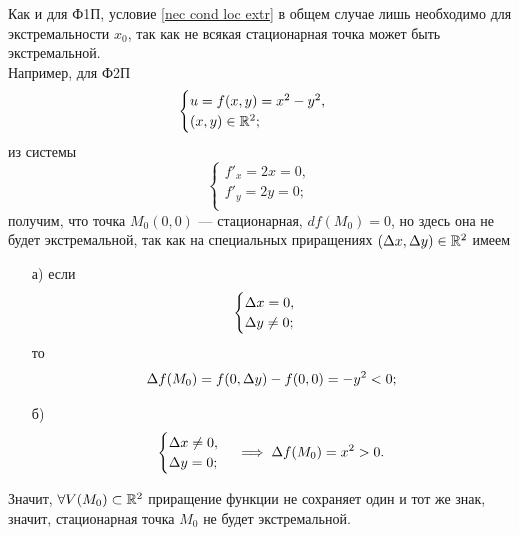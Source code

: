 \documentclass[../../main.tex]{subfiles}
\begin{document}
	\begin{rem}
		Как и для Ф1П, условие \eqref{nec cond loc extr} в общем случае
		лишь необходимо для экстремальности $x_0$, так как не всякая
		стационарная точка может быть экстремальной. \\
		Например, для Ф2П
		\[
		\begin{cases}
			u = f (x, y) = x^2 - y^2, \\
			(x, y) \in \mathbb{R}^2; \\
		\end{cases}
		\]
		из системы
		\[
		\begin{cases}
			f'_x = 2x = 0, \\
			f'_y = 2y = 0; \\
		\end{cases}
		\]
		получим, что точка $M_0 (0, 0)$ --- стационарная,
		$df (M_0) = 0$,
		но здесь она не будет экстремальной, так как на специальных приращениях
		$(\Delta x, \Delta y) \in \mathbb{R}^2$ имеем
		\begin{enumerate}
			\item[а)]
			если
			\[
			\begin{cases}
				\Delta x = 0, \\
				\Delta y \ne 0; \\
			\end{cases}
			\]
			то
			\[
				\Delta f (M_0)
				= f (0, \Delta y) - f (0, 0)
				= -y^2 < 0;
			\]
			
			\item[б)]
			\[
			\begin{cases}
				\Delta x \ne 0, \\
				\Delta y = 0; \\
			\end{cases}
			\implies
			\Delta f (M_0)
			= x^2 > 0.
			\]
		\end{enumerate}
		Значит, $\forall V (M_0) \subset \mathbb{R}^2$ приращение функции
		не сохраняет один и тот же знак, значит, стационарная точка $M_0$
		не будет экстремальной.
	\end{rem}
	
\end{document}

